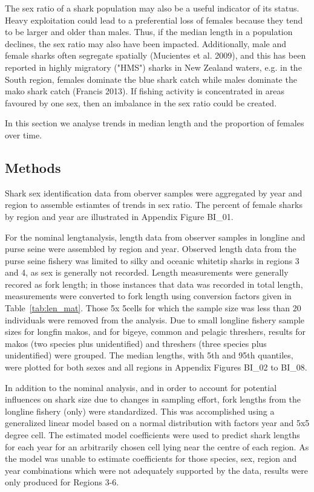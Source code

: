 \documentclass[12pt]{SCreport}
\begin{document}
The sex ratio of a shark population may also be a useful indicator of its status. Heavy exploitation could lead to a preferential loss of females because they tend to be larger and older than males. Thus, if the median length in a population declines, the sex ratio may also have been impacted. Additionally, male
and female sharks often segregate spatially (Mucientes et al. 2009), and this has been reported in
highly migratory ("HMS") sharks in New Zealand waters, e.g. in the South region, females dominate the blue shark catch while males dominate the mako shark catch (Francis 2013). If fishing activity is concentrated in areas favoured
by one sex, then an imbalance in the sex ratio could be created.

In this section we analyse trends in median length and the proportion of females over time.  
      

\subsection{Methods}
Shark sex identification data from oberver samples were aggregated by year and region to assemble estiamtes of trends in sex ratio.  The percent of female sharks by region and year are illustrated in Appendix Figure BI\_01.

  
For the nominal lengtanalysis, length data from observer samples in longline and purse seine were assembled by region and year.  Observed length data from the purse seine fishery was limited to silky and oceanic whitetip sharks in regions 3 and 4, as sex is generally not recorded.  Length measurements were generally recored as fork length; in those instances that data was recorded in total length, measurements were converted to fork length using conversion factors given in Table~\ref{tab:len_mat}. Those 5\degree x 5\degree cells for which the sample size was less than 20 individuals were removed from the analysis.  Due to small longline fishery sample sizes for longfin makos, and for bigeye, common and pelagic threshers, results for makos (two species plus unidentified) and threshers (three species plus unidentified) were grouped. The median lengths, with 5th and 95th quantiles, were plotted for both sexes and all regions in Appendix Figures BI\_02 to BI\_08.  


In addition to the nominal analysis, and in order to account for potential influences on shark size due to changes in sampling effort, fork lengths from the longline fishery (only) were standardized. This was accomplished using a generalized linear model based on a normal distribution with factors year and 5x5 degree cell. The estimated model coefficients were used to predict shark lengths for each year for an arbitrarily chosen cell lying near the centre of each region. As the model was unable to estimate coefficients for those species, sex, region and year combinations which were not adequately supported by the data, results were only produced for Regions 3-6.
\end{document}

